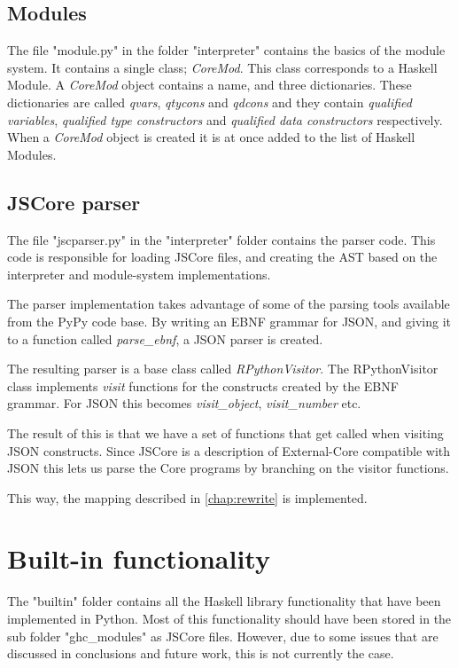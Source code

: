 \subsection*{Modules}

The file "module.py" in the folder "interpreter" contains the basics of the
module system. It contains a single class; \emph{CoreMod}. This class corresponds
to a Haskell Module. A \emph{CoreMod} object contains a name, and three dictionaries.
These dictionaries are called \emph{qvars}, \emph{qtycons} and \emph{qdcons} and they
contain \emph{qualified variables}, \emph{qualified type constructors} and 
\emph{qualified data constructors} respectively. When a \emph{CoreMod} object is created
it is at once added to the list of Haskell Modules.

\subsection*{JSCore parser}

The file "jscparser.py" in the "interpreter" folder contains the parser code. 
This code is responsible for loading JSCore files, and creating the AST based 
on the interpreter and module-system implementations.

The parser implementation takes advantage of some of the parsing tools 
available from
the PyPy code base. By writing an EBNF grammar for JSON, and giving it to a 
function called \emph{parse\_ebnf}, a JSON parser is created.

The resulting parser is a base class called \emph{RPythonVisitor}. The 
RPythonVisitor
class implements \emph{visit} functions for the constructs created by the 
EBNF grammar. For JSON this becomes \emph{visit\_object}, 
\emph{visit\_number} etc.

The result of this is that we have a set of functions that get called when 
visiting JSON constructs. Since JSCore is a description of External-Core 
compatible with JSON this lets us parse the Core programs by branching 
on the visitor functions.

This way, the mapping described in \ref{chap:rewrite} is implemented.

\section{Built-in functionality}

The "builtin" folder contains all the Haskell library functionality that
have been implemented in Python. Most of this functionality should have been
stored in the sub folder "ghc\_modules" as JSCore files. However, due to some 
issues that are discussed in conclusions and future work, this is not currently
the case.

